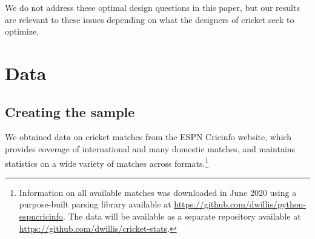 \documentclass[11pt,  letterpaper]{article}
\begin{document}
We do not address these optimal design questions in this paper, but our results are relevant to these issues depending on what the designers of cricket seek to optimize. %




\section{Data}

\subsection{Creating the sample}

We obtained data on cricket matches from the ESPN Cricinfo website, which provides coverage of international and many domestic matches,
and maintains statistics on a wide variety of matches across formats.\footnote{Information on all available matches was downloaded in June 2020 using a purpose-built parsing library available at \href{https://github.com/dwillis/python-espncricinfo}{https://github.com/dwillis/python-espncricinfo}. The data will be available as a separate repository available at \href{https://github.com/dwillis/cricket-stats}{https://github.com/dwillis/cricket-stats}.} 
\end{document}
